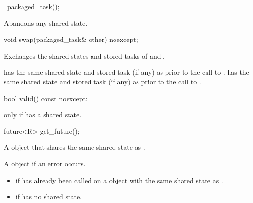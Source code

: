 %
\begin{itemdecl}
~packaged_task();
\end{itemdecl}

\begin{itemdescr}
\pnum
\effects
Abandons any shared state.
\end{itemdescr}

%
\begin{itemdecl}
void swap(packaged_task& other) noexcept;
\end{itemdecl}

\begin{itemdescr}
\pnum
\effects Exchanges the shared states and stored tasks of  and .

\pnum
\postconditions {} has the same shared state
and stored task (if any) as 
prior to the call to .  has the same shared state
and stored task (if any)
as  prior to the call to .
\end{itemdescr}

%
\begin{itemdecl}
bool valid() const noexcept;
\end{itemdecl}

\begin{itemdescr}
\pnum
\returns {} only if  has a shared state.
\end{itemdescr}

%
\begin{itemdecl}
future<R> get_future();
\end{itemdecl}

\begin{itemdescr}
\pnum
\returns A  object that shares the same shared state as .

\pnum
\throws A  object if an error occurs.

\pnum
\errors
\begin{itemize}
\item {} if  has already been called on
a  object with the same shared state as .
\item {} if  has no shared state.
\end{itemize}
\end{itemdescr}

